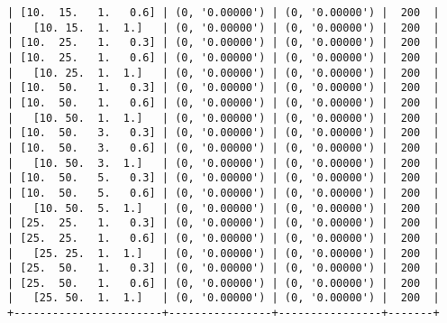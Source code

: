 \documentclass{article}
\begin{document}
\begin{verbatim}
| [10.  15.   1.   0.6] | (0, '0.00000') | (0, '0.00000') |  200  |
|   [10. 15.  1.  1.]   | (0, '0.00000') | (0, '0.00000') |  200  |
| [10.  25.   1.   0.3] | (0, '0.00000') | (0, '0.00000') |  200  |
| [10.  25.   1.   0.6] | (0, '0.00000') | (0, '0.00000') |  200  |
|   [10. 25.  1.  1.]   | (0, '0.00000') | (0, '0.00000') |  200  |
| [10.  50.   1.   0.3] | (0, '0.00000') | (0, '0.00000') |  200  |
| [10.  50.   1.   0.6] | (0, '0.00000') | (0, '0.00000') |  200  |
|   [10. 50.  1.  1.]   | (0, '0.00000') | (0, '0.00000') |  200  |
| [10.  50.   3.   0.3] | (0, '0.00000') | (0, '0.00000') |  200  |
| [10.  50.   3.   0.6] | (0, '0.00000') | (0, '0.00000') |  200  |
|   [10. 50.  3.  1.]   | (0, '0.00000') | (0, '0.00000') |  200  |
| [10.  50.   5.   0.3] | (0, '0.00000') | (0, '0.00000') |  200  |
| [10.  50.   5.   0.6] | (0, '0.00000') | (0, '0.00000') |  200  |
|   [10. 50.  5.  1.]   | (0, '0.00000') | (0, '0.00000') |  200  |
| [25.  25.   1.   0.3] | (0, '0.00000') | (0, '0.00000') |  200  |
| [25.  25.   1.   0.6] | (0, '0.00000') | (0, '0.00000') |  200  |
|   [25. 25.  1.  1.]   | (0, '0.00000') | (0, '0.00000') |  200  |
| [25.  50.   1.   0.3] | (0, '0.00000') | (0, '0.00000') |  200  |
| [25.  50.   1.   0.6] | (0, '0.00000') | (0, '0.00000') |  200  |
|   [25. 50.  1.  1.]   | (0, '0.00000') | (0, '0.00000') |  200  |
+-----------------------+----------------+----------------+-------+
\end{verbatim}
\end{document}
